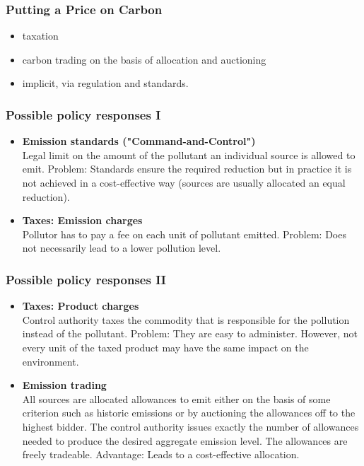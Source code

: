 \begin{frame}
  \frametitle{Putting a Price on Carbon}
   \begin{itemize}
  \item<1-> taxation
  \item<2-> carbon trading on the basis of allocation and auctioning
  \item<3-> implicit, via regulation and standards.
  \end{itemize}
\end{frame}
\begin{frame}
  \frametitle{Possible policy responses I}
  \begin{itemize}
  \item<1-> \textbf{Emission standards ("Command-and-Control")} \\
        Legal limit on the amount of the pollutant an individual source is allowed to emit. %
        Problem: Standards ensure the required reduction but in practice it is not achieved in a cost-effective way (sources are usually allocated an equal reduction).
  \item<2-> \textbf{Taxes: Emission charges} \\
        Pollutor has to pay a fee on each unit of pollutant emitted. %
        Problem: Does not necessarily lead to a lower pollution level.
  \end{itemize}
  \end{frame}

  \begin{frame}
  \frametitle{Possible policy responses II}
  \begin{itemize}
  \item<1-> \textbf{Taxes: Product charges} \\
        Control authority taxes the commodity that is responsible for the pollution instead of the pollutant. %
        Problem: They are easy to administer. However, not every unit of the taxed product may have the same impact on the environment. \\
  \item<2-> \textbf{Emission trading} \\
        All sources are allocated allowances to emit either on the basis of some criterion such as historic emissions or by auctioning the allowances off to the highest bidder.
        The control authority issues exactly the number of allowances needed to produce the desired aggregate emission level.
        The allowances are freely tradeable.
        Advantage: Leads to a cost-effective allocation.
  \end{itemize}
\end{frame}

